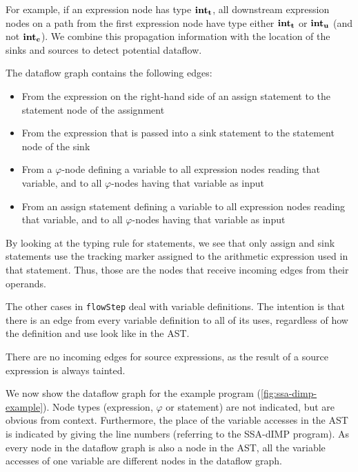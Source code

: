 For example, if an expression node has type $\textbf{int}_\textbf{t}$,
all downstream expression nodes on a path from the first expression node 
have type either $\textbf{int}_\textbf{t}$ or $\textbf{int}_\textbf{u}$ (and not $\textbf{int}_\textbf{c}$).
We combine this propagation information with the location of the sinks and sources 
to detect potential dataflow.

The dataflow graph contains the following edges:
\begin{itemize}
    \item From the expression on the right-hand side of an assign statement 
    to the statement node of the assignment
    \item From the expression that is passed into a sink statement to the statement node
    of the sink
    \item From a $\varphi$-node defining a variable to all expression nodes reading 
    that variable, and to all $\varphi$-nodes having that variable as input
    \item From an assign statement defining a variable to all expression nodes reading 
    that variable, and to all $\varphi$-nodes having that variable as input
\end{itemize}

By looking at the typing rule for statements, we see that only assign and sink statements
use the tracking marker assigned to the arithmetic expression used in that statement.
Thus, those are the nodes that receive incoming edges from their operands.

The other cases in \texttt{flowStep} deal with variable definitions.
The intention is that there is an edge from every variable definition to all of its uses,
regardless of how the definition and use look like in the AST.

There are no incoming edges for source expressions, as the result of a source expression
is always tainted.

We now show the dataflow graph for the example program (\autoref{fig:ssa-dimp-example}).
Node types (expression, $\varphi$ or statement) are not indicated, but are obvious from context.
Furthermore, the place of the variable accesses in the AST is indicated by giving the 
line numbers (referring to the SSA-dIMP program).
As every node in the dataflow graph is also a node in the AST, all the variable accesses
of one variable are different nodes in the dataflow graph.

